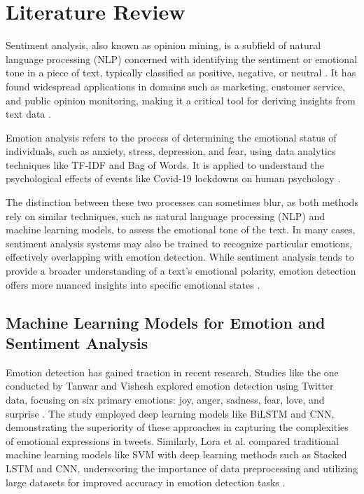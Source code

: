 

\section{Literature Review}

Sentiment analysis, also known as opinion mining, is a subfield of natural language processing (NLP) concerned with identifying the sentiment or emotional tone in a piece of text, typically classified as positive, negative, or neutral \cite{Saad2017}. It has found widespread applications in domains such as marketing, customer service, and public opinion monitoring, making it a critical tool for deriving insights from text data \cite{Rodriguez2023}.

Emotion analysis refers to the process of determining the emotional status of individuals, such as anxiety, stress, depression, and fear, using data analytics techniques like TF-IDF and Bag of Words. It is applied to understand the psychological effects of events like Covid-19 lockdowns on human psychology \cite{Chatterjee2023}.

The distinction between these two processes can sometimes blur, as both methods rely on similar techniques, such as natural language processing (NLP) and machine learning models, to assess the emotional tone of the text. In many cases, sentiment analysis systems may also be trained to recognize particular emotions, effectively overlapping with emotion detection. While sentiment analysis tends to provide a broader understanding of a text’s emotional polarity, emotion detection offers more nuanced insights into specific emotional states \cite{oneai_sentiment_emotion}.

\subsection{Machine Learning Models for Emotion and Sentiment Analysis}

Emotion detection has gained traction in recent research. Studies like the one conducted by Tanwar and Vishesh explored emotion detection using Twitter data, focusing on six primary emotions: joy, anger, sadness, fear, love, and surprise \cite{Tanwar2024}. The study employed deep learning models like BiLSTM and CNN, demonstrating the superiority of these approaches in capturing the complexities of emotional expressions in tweets. Similarly, Lora et al. compared traditional machine learning models like SVM with deep learning methods such as Stacked LSTM and CNN, underscoring the importance of data preprocessing and utilizing large datasets for improved accuracy in emotion detection tasks \cite{Lora2020}.

